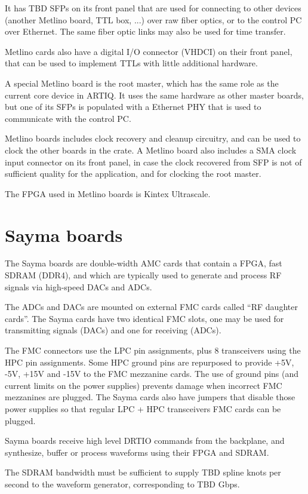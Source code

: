 \documentclass[11pt]{paper}
\begin{document}
It has TBD SFPs on its front panel that are used for connecting to other devices (another Metlino board, TTL box, ...) over raw fiber optics, or to the control PC over Ethernet. The same fiber optic links may also be used for time transfer.

Metlino cards also have a digital I/O connector (VHDCI) on their front panel, that can be used to implement TTLs with little additional hardware.

A special Metlino board is the root master, which has the same role as the current core device in ARTIQ. It uses the same hardware as other master boards, but one of its SFPs is populated with a Ethernet PHY that is used to communicate with the control PC.

Metlino boards includes clock recovery and cleanup circuitry, and can be used to clock the other boards in the crate. A Metlino board also includes a SMA clock input connector on its front panel, in case the clock recovered from SFP is not of sufficient quality for the application, and for clocking the root master.

The FPGA used in Metlino boards is Kintex Ultrascale.

\section{Sayma boards}
The Sayma boards are double-width AMC cards that contain a FPGA, fast SDRAM (DDR4), and which are typically used to generate and process RF signals via high-speed DACs and ADCs.

The ADCs and DACs are mounted on external FMC cards called ``RF daughter cards''. The Sayma cards have two identical FMC slots, one may be used for transmitting signals (DACs) and one for receiving (ADCs).

The FMC connectors use the LPC pin assignments, plus 8 transceivers using the HPC pin assignments. Some HPC ground pins are repurposed to provide +5V, -5V, +15V and -15V to the FMC mezzanine cards. The use of ground pins (and current limits on the power supplies) prevents damage when incorrect FMC mezzanines are plugged. The Sayma cards also have jumpers that disable those power supplies so that regular LPC + HPC transceivers FMC cards can be plugged.

Sayma boards receive high level DRTIO commands from the backplane, and synthesize, buffer or process waveforms using their FPGA and SDRAM.

The SDRAM bandwidth must be sufficient to supply TBD spline knots per second to the waveform generator, corresponding to TBD Gbps.
\end{document}
